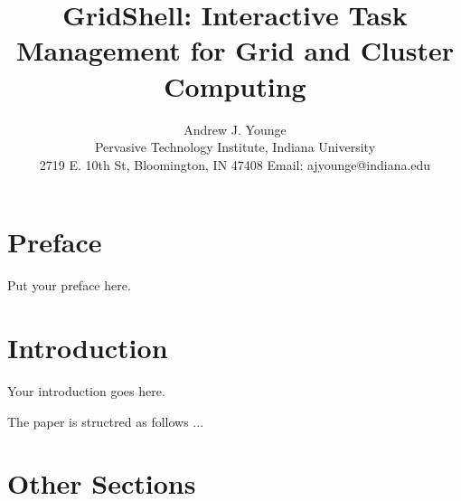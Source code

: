 \pagestyle{fancy}


\newcommand{\SHELL}{GridShell}
\newcommand{\AUTHOR}{%
Andrew J. Younge\\
Pervasive Technology Institute, Indiana University \\
2719 E. 10th St, Bloomington, IN 47408
Email: ajyounge@indiana.edu%

}
\newcommand{\TITLE}{\SHELL: Interactive Task Management for Grid and Cluster Computing}

\title{\TITLE}
\author{\AUTHOR}

\maketitle
\clearpage

\tableofcontents

\clearpage

\listoffigures

\listoftables

\clearpage


\section*{Preface}

Put your preface here. 

\section{Introduction}

Your introduction goes here. 

The paper is structred as follows ...


\section{Other Sections}

